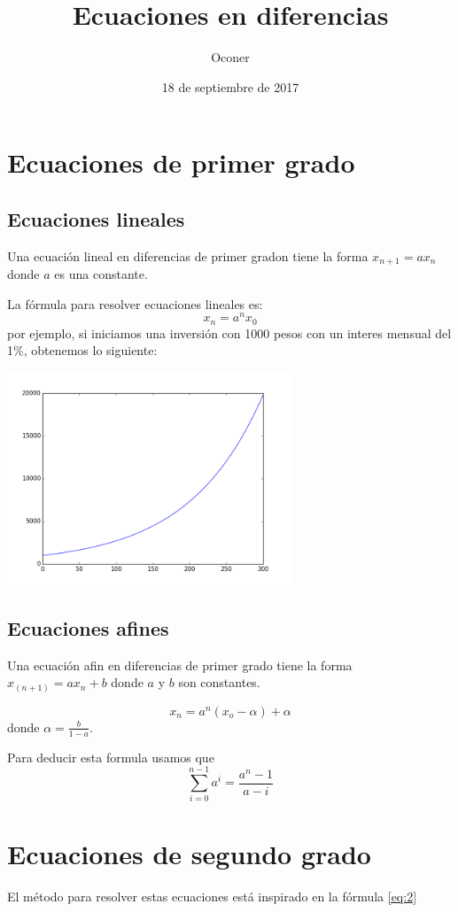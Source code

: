 \documentclass{article}
\title{Ecuaciones en diferencias}
\author{Oconer}
\date{18 de septiembre de 2017}
\begin{document}
\maketitle

\section{Ecuaciones de primer grado}
\subsection{Ecuaciones lineales}
Una ecuación lineal en diferencias de primer gradon tiene la forma $x_{n+1}=ax_n$
donde $a$ es una constante.

La fórmula para resolver ecuaciones lineales es:
\begin{equation}
\label{eq:2}
  x_n=a^nx_0
\end{equation}
por ejemplo, si iniciamos una inversión con 1000 pesos con un interes mensual del 1\%, obtenemos lo siguiente:

\begin{center}
  \includegraphics[width=8.5cm]{inversion.png}
\end{center}


\subsection{Ecuaciones afines}
Una ecuación afin en diferencias de primer grado tiene la forma $x_(n+1)=ax_n+b$
donde $a$ y $b$ son constantes.

\begin{equation}
 \label{eq:1}
  x_n=a^n(x_o-\alpha)+\alpha
\end{equation}
 donde $\alpha=\frac{b}{1-a}$.

 Para deducir esta formula usamos que
  $$\sum_{i=0}^{n-1}a^i=\frac{a^n-1}{a-i}$$

 \section{Ecuaciones de segundo grado}
 El método para resolver estas ecuaciones está inspirado en la fórmula \ref{eq:2}
 
\end{document}
